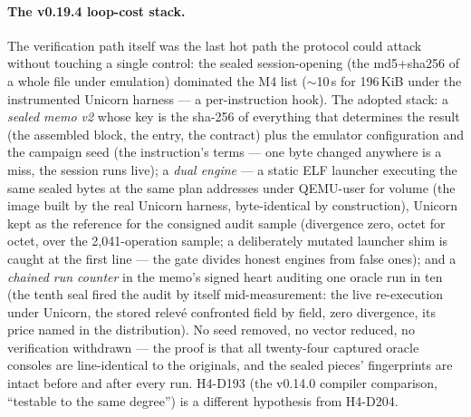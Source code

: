 \documentclass[10pt,a4paper]{article}
\begin{document}
\paragraph{The v0.19.4 loop-cost stack.} The verification path itself
was the last hot path the protocol could attack without touching a
single control: the sealed session-opening (the md5+sha256 of a whole
file under emulation) dominated the M4 list ($\sim$10\,s for
196\,KiB under the instrumented Unicorn harness --- a per-instruction
hook). The adopted stack: a \emph{sealed memo v2} whose key is the
sha-256 of everything that determines the result (the assembled block,
the entry, the contract) plus the emulator configuration and the
campaign seed (the instruction's terms --- one byte changed anywhere is
a miss, the session runs live); a \emph{dual engine} --- a static ELF
launcher executing the same sealed bytes at the same plan addresses
under QEMU-user for volume (the image built by the real Unicorn harness,
byte-identical by construction), Unicorn kept as the reference for the
consigned audit sample (divergence zero, octet for octet, over the
2{,}041-operation sample; a deliberately mutated launcher shim is
caught at the first line --- the gate divides honest engines from false
ones); and a \emph{chained run counter} in the memo's signed heart
auditing one oracle run in ten (the tenth seal fired the audit by
itself mid-measurement: the live re-execution under Unicorn, the stored
relev\'e confronted field by field, zero divergence, its price named
in the distribution). No seed removed, no vector reduced, no
verification withdrawn --- the proof is that all twenty-four captured
oracle consoles are line-identical to the originals, and the sealed
pieces' fingerprints are intact before and after every run. H4-D193 (the
v0.14.0 compiler comparison, ``testable to the same degree'') is a
different hypothesis from H4-D204.
\end{document}
